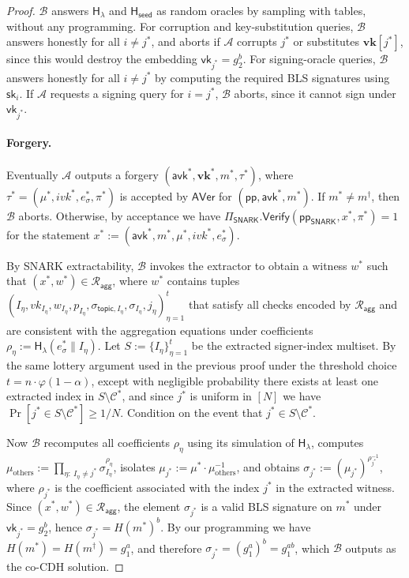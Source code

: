 \documentclass{article}
\newcommand{\ppSNARK}[0]{\mathsf{pp}_{\mathsf{SNARK}}}
\newcommand{\pp}[0]{\mathsf{pp}}
\newcommand{\sk}[0]{\mathsf{sk}}
\newcommand{\vk}[0]{\mathsf{vk}}
\newcommand{\avk}[0]{\mathsf{avk}}
\newcommand{\topic}[0]{\mathsf{topic}}
\begin{document}
\begin{proof}
$\mathcal{B}$ answers $\mathsf{H_\lambda}$ and $\mathsf{H_{seed}}$ as random oracles by sampling with tables, without any programming. For corruption and key-substitution queries, $\mathcal{B}$ answers honestly for all $i\neq j^\ast$, and aborts if $\mathcal{A}$ corrupts $j^\ast$ or substitutes $\mathbf{vk}[j^\ast]$, since this would destroy the embedding $\vk_{j^\ast}=g_2^{b}$. For signing-oracle queries, $\mathcal{B}$ answers honestly for all $i\neq j^\ast$ by computing the required BLS signatures using $\sk_i$. If $\mathcal{A}$ requests a signing query for $i=j^\ast$, $\mathcal{B}$ aborts, since it cannot sign under $\vk_{j^\ast}$.


\paragraph{Forgery.}
Eventually $\mathcal{A}$ outputs a forgery $(\avk^\ast,\mathbf{vk}^\ast,m^\ast,\tau^\ast)$, where $\tau^\ast=(\mu^\ast,ivk^\ast,e_\sigma^\ast,\pi^\ast)$ is accepted by $\mathsf{AVer}$ for $(\pp,\avk^\ast,m^\ast)$. If $m^\ast\neq m^\dagger$, then $\mathcal{B}$ aborts. Otherwise, by acceptance we have $\Pi_{\mathsf{SNARK}}.\mathsf{Verify}(\ppSNARK,x^\ast,\pi^\ast)=1$ for the statement $x^\ast:=(\avk^\ast,m^\ast,\mu^\ast,ivk^\ast,e_\sigma^\ast)$.

By SNARK extractability, $\mathcal{B}$ invokes the extractor to obtain a witness $w^\ast$ such that $(x^\ast,w^\ast)\in\mathcal{R}_{\mathsf{agg}}$, where $w^\ast$ contains tuples $(I_\eta,vk_{I_\eta},w_{I_\eta},p_{I_\eta},\sigma_{\topic,I_\eta},\sigma_{I_\eta},j_\eta)_{\eta=1}^{t}$ that satisfy all checks encoded by $\mathcal{R}_{\mathsf{agg}}$ and are consistent with the aggregation equations under coefficients $\rho_\eta:=\mathsf{H_\lambda}(e_\sigma^\ast\|I_\eta)$. Let $S:=\{I_\eta\}_{\eta=1}^{t}$ be the extracted signer-index multiset. By the same lottery argument used in the previous proof under the threshold choice $t=n\cdot\varphi(1-\alpha)$, except with negligible probability there exists at least one extracted index in $S\setminus \mathcal{C}^\ast$, and since $j^\ast$ is uniform in $[N]$ we have $\Pr[j^\ast\in S\setminus \mathcal{C}^\ast]\ge 1/N$. Condition on the event that $j^\ast\in S\setminus \mathcal{C}^\ast$.

Now $\mathcal{B}$ recomputes all coefficients $\rho_\eta$ using its simulation of $\mathsf{H_\lambda}$, computes $\mu_{\mathrm{others}}:=\prod_{\eta:\ I_\eta\neq j^\ast}\sigma_{I_\eta}^{\rho_\eta}$, isolates $\mu_{j^\ast}:=\mu^\ast\cdot \mu_{\mathrm{others}}^{-1}$, and obtains $\sigma_{j^\ast}:=(\mu_{j^\ast})^{\rho_{j^\ast}^{-1}}$, where $\rho_{j^\ast}$ is the coefficient associated with the index $j^\ast$ in the extracted witness. Since $(x^\ast,w^\ast)\in\mathcal{R}_{\mathsf{agg}}$, the element $\sigma_{j^\ast}$ is a valid BLS signature on $m^\ast$ under $\vk_{j^\ast}=g_2^{b}$, hence $\sigma_{j^\ast}=H(m^\ast)^{b}$. By our programming we have $H(m^\ast)=H(m^\dagger)=g_1^{a}$, and therefore $\sigma_{j^\ast}=(g_1^{a})^{b}=g_1^{ab}$, which $\mathcal{B}$ outputs as the co-\textsf{CDH} solution.


\end{proof}
\end{document}
